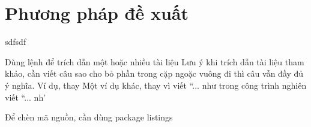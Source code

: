 \chapter{Phương pháp đề xuất}
\label{approachs}

sdfsdf



Dùng lệnh để trích dẫn một hoặc nhiều tài liệu
Lưu ý khi trích dẫn tài liệu tham khảo, cần viết câu sao cho bỏ phần trong cặp ngoặc vuông đi thì câu vẫn đầy đủ ý nghĩa.
Ví dụ, thay 
Một ví dụ khác, thay vì viết ``... như trong công trình nghiên viết ``... nh'

Để chèn mã nguồn, cần dùng package listings
